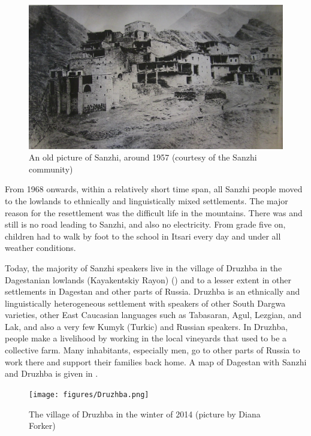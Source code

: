 \begin{figure}
	\caption{An old picture of Sanzhi, around 1957 (courtesy of the Sanzhi community)}
	\label{fig:Sanzhi 3}
	\includegraphics[scale=0.3]{figures/Sanzhi_3.png}
\end{figure}




From 1968 onwards, within a relatively short time span, all Sanzhi people moved to the lowlands to ethnically and linguistically mixed settlements. The major reason for the resettlement was the difficult life in the mountains. There was and still is no road leading to Sanzhi, and also no electricity. From grade five on, children had to walk by foot to the school in Itsari every day and under all weather conditions.

Today, the majority of Sanzhi speakers live in the village of Druzhba in the Dagestanian lowlands (Kayakentskiy Rayon) () and to a lesser extent in other settlements in Dagestan and other parts of Russia. Druzhba is an ethnically and linguistically heterogeneous settlement with speakers of other South Dargwa varieties, other East Caucasian languages such as Tabasaran, Agul, Lezgian, and Lak, and also a very few Kumyk (Turkic) and Russian speakers. In Druzhba, people make a livelihood by working in the local vineyards that used to be a collective farm. Many inhabitants, especially men, go to other parts of Russia to work there and support their families back home. A map of Dagestan with Sanzhi and Druzhba is given in .

\begin{figure}
	\caption{The village of Druzhba in the winter of 2014 (picture by Diana Forker)}
	\label{fig:Druzhba}
	\texttt{[image: figures/Druzhba.png]}
\end{figure}


